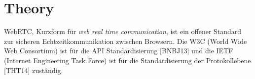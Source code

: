 \chapter{Theory}

WebRTC, Kurzform für \textit{web real time communication}, ist ein offener Standard zur sicheren Echtzeitkommunikation zwischen Browsern. Die W3C (World Wide Web Consortium) ist für die API Standardisierung [BNBJ13] und die IETF (Internet Engineering Task Force) ist für die Standardisierung der Protokollebene [THT14] zuständig.
